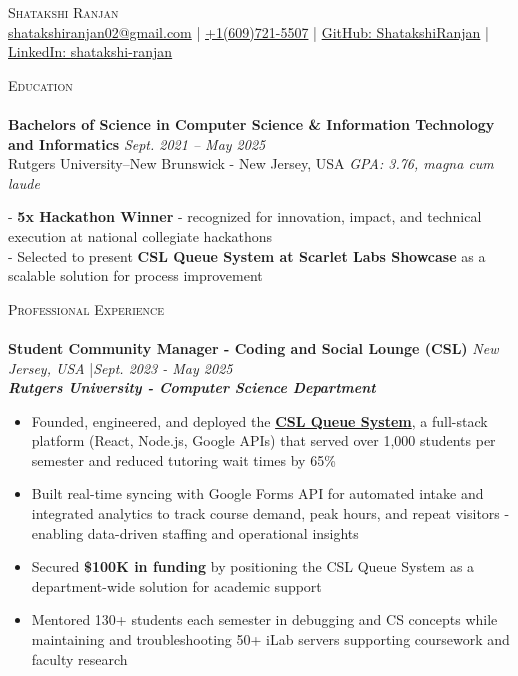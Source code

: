 \documentclass[a4paper]{article}
\newcommand{\lineunder} {
    \vspace*{-8pt} \\
    \hspace*{-18pt} \hrulefill \\
}
\newcommand{\header} [1] {
    {\hspace*{-18pt}\vspace*{6pt} \textsc{#1}}
    \vspace*{-6pt} \lineunder
}
\begin{document}
\vspace*{-35pt}

\begin{center}
{\Large \scshape Shatakshi Ranjan}\\
\vspace{2pt}
\small{ \href{mailto:shatakshiranjan02@gmail.com}{shatakshiranjan02@gmail.com}  | \href{tel:6097215507}{+1(609)721-5507} | \href{https://github.com/ShatakshiRanjan}{GitHub: ShatakshiRanjan}  | \href{https://www.linkedin.com/in/shatakshi-ranjan/}{LinkedIn: shatakshi-ranjan}}\\
\end{center}
\vspace{-4pt} 

%
%
\header{Education}
\textbf{Bachelors of Science in Computer Science \& Information Technology and Informatics} \hfill \textit{Sept. 2021 – May 2025} \\
Rutgers University–New Brunswick - New Jersey, USA \hfill \textit{GPA: 3.76, magna cum laude}

  \vspace{1mm}
  - \textbf{5x Hackathon Winner} - recognized for innovation, impact, and technical execution at national collegiate hackathons \\
  - Selected to present \textbf{CSL Queue System at Scarlet Labs Showcase} as a scalable solution for process improvement  \\

  \vspace{1mm}
%
%
\header{Professional Experience}

\textbf{Student Community Manager - Coding and Social Lounge (CSL)} \hfill \textit{New Jersey, USA} |\textit{Sept. 2023 - May 2025} \\
\textit{\textbf{Rutgers University - Computer Science Department}}
\vspace{-2.5mm}
\begin{itemize} \itemsep -4pt 
    \item Founded, engineered, and deployed the \textbf{\href{https://github.com/Rutgers-CSL}{CSL Queue System}}, a full-stack platform (React, Node.js, Google APIs) that served over 1,000 students per semester and reduced tutoring wait times by 65\%
    \item Built real-time syncing with Google Forms API for automated intake and integrated analytics to track course demand, peak hours, and repeat visitors - enabling data-driven staffing and operational insights
    \item Secured \textbf{\$100K in funding} by positioning the CSL Queue System as a department-wide solution for academic support 
    \item Mentored 130+ students each semester in debugging and CS concepts while maintaining and troubleshooting 50+ iLab servers supporting coursework and faculty research
\end{itemize}
\vspace{-2mm}
\end{document}

